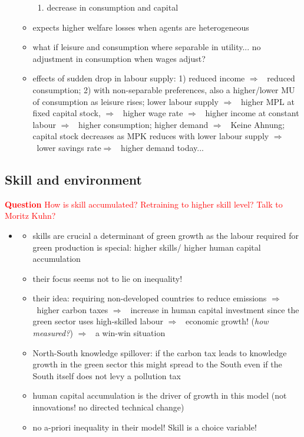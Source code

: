 \documentclass[12pt]{article}
\newcommand{\ar}{$\Rightarrow$ \ }
\newcommand{\tr}[1]{\textcolor{red}{#1}}
\begin{document}
\begin{itemize}
\begin{itemize}
\begin{enumerate}
\item decrease in consumption and capital 
\end{enumerate}
\item expects higher welfare losses when agents are heterogeneous
\item what if leisure and consumption where separable in utility... no adjustment in consumption when wages adjust?
\item effects of sudden drop in labour supply: 1) reduced income \ar reduced consumption; 2) with non-separable preferences, also a higher/lower MU of consumption as leisure rises;
lower labour supply \ar higher MPL at fixed capital stock, \ar higher wage rate \ar higher income at constant labour \ar higher consumption;
higher demand \ar Keine Ahnung;
capital stock decreases as MPK reduces with lower labour supply \ar lower savings rate\ar higher demand today... 
\end{itemize}
\end{itemize}

\subsection{Skill and environment}
\tr{\textbf{Question} How is skill accumulated? Retraining to higher skill level? Talk to Moritz Kuhn?}
\begin{itemize}
\item \cite{Borissov2019CarbonDevelopment}
\begin{itemize}
\item skills are crucial a determinant of green growth as the labour required for green production is special: higher skills/ higher human capital accumulation
\item their focus seems not to lie on inequality!
\item their idea: requiring non-developed countries to reduce emissions \ar higher carbon taxes \ar increase in human capital investment since the green sector uses high-skilled labour \ar economic growth! (\textit{how measured?}) \ar a win-win situation
\item North-South knowledge spillover: if the carbon tax leads to knowledge growth in the green sector this might spread to the South even if the South itself does not levy a pollution tax
\item human capital accumulation is the driver of growth in this model (not innovations! no directed technical change)
\item no a-priori inequality in their model! Skill is a choice variable! 
\end{itemize}
\end{itemize}
\end{document}
